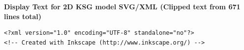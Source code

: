 \pagebreak
\textbf{Display Text for 2D KSG model SVG/XML (Clipped text from 671 lines total)}


\begin{lstlisting}[caption={App4-Display Text for 2D KSG model SVG/XML}, label=App4-Display Text for 2D KSG model SVG/XML]
<?xml version="1.0" encoding="UTF-8" standalone="no"?>
<!-- Created with Inkscape (http://www.inkscape.org/) -->


\end{lstlisting}
